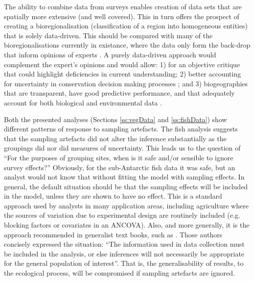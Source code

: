 \documentclass{statsoc}
\begin{document}
The ability to combine data from surveys enables creation of data sets that are spatially more extensive (and well covered). This in turn offers the prospect of creating a bioregionalisation (classification of a region into homogeneous entities) that is solely data-driven. This should be compared with many of the bioregionalisations currently in existance, where the data only form the back-drop that inform opinions of experts \citep[for example][]{tha97}. A purely data-driven approach would complement the expert's opinions and would allow: 1) for an objective critique that could highlight deficiencies in current understanding; 2) better accounting for uncertainty in conservation decision making processes \citep{bur05}; and 3) biogeographies that are transparent, have good predictive performance, and that adequately account for both biological and environmental data \citep[see][for a disucssion of why these are beneficial]{mcg06}.

Both the presented analyses (Sections \ref{ss:vegData} and \ref{ss:fishData}) show different patterns of response to sampling artefacts. The fish analysis suggests that the sampling artefacts did not alter the inference substantially as the groupings did nor did measures of uncertainty. This leads us to the question of ``For the purposes of grouping sites, when is it safe and/or sensible to ignore survey effects?'' Obviously, for the sub-Antarctic fish data it was safe, but an analyst would not know that without fitting the model with sampling effects. In general, the default situation should be that the sampling effects will be included in the model, unless they are shown to have no effect. This is a standard approach used by analysts in many application areas, including agriculture where the sources of variation due to experimental design are routinely included (e.g. blocking factors or covariates in an ANCOVA). Also, and more generally, it is the approach recommended in generalist text books, such as \citet[][Chapter 8]{gel13}. Those authors concisely expressed the situation: ``The information used in data collection must be included in the analysis, or else inferences will not necessarily be appropriate for the general population of interest''. That is, the generalisability of results, to the ecological process, will be compromised if sampling artefacts are ignored.
\end{document}
